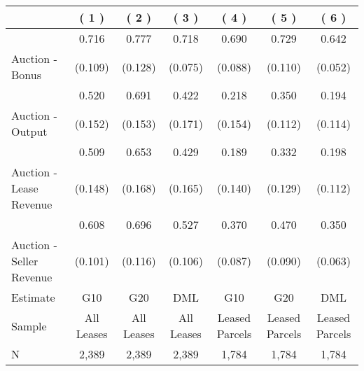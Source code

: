 
\begin{tabular}{lcccccc}
\toprule
  & ( 1 ) & ( 2 ) & ( 3 ) & ( 4 ) & ( 5 ) & ( 6 )\\
\midrule
 & 0.716 & 0.777 & 0.718 & 0.690 & 0.729 & 0.642\\

\multirow{-2}{*}{\raggedright\arraybackslash Auction - Bonus} & (0.109) & (0.128) & (0.075) & (0.088) & (0.110) & (0.052)\\

\midrule
 & 0.520 & 0.691 & 0.422 & 0.218 & 0.350 & 0.194\\

\multirow{-2}{*}{\raggedright\arraybackslash Auction - Output} & (0.152) & (0.153) & (0.171) & (0.154) & (0.112) & (0.114)\\

\midrule
 & 0.509 & 0.653 & 0.429 & 0.189 & 0.332 & 0.198\\

\multirow{-2}{*}{\raggedright\arraybackslash Auction - Lease Revenue} & (0.148) & (0.168) & (0.165) & (0.140) & (0.129) & (0.112)\\

\midrule
 & 0.608 & 0.696 & 0.527 & 0.370 & 0.470 & 0.350\\

\multirow{-2}{*}{\raggedright\arraybackslash Auction - Seller Revenue} & (0.101) & (0.116) & (0.106) & (0.087) & (0.090) & (0.063)\\

\midrule
Estimate & G10 & G20 & DML & G10 & G20 & DML\\

Sample & All Leases & All Leases & All Leases & Leased Parcels & Leased Parcels & Leased Parcels\\

N & 2,389 & 2,389 & 2,389 & 1,784 & 1,784 & 1,784\\
\bottomrule
\end{tabular}
